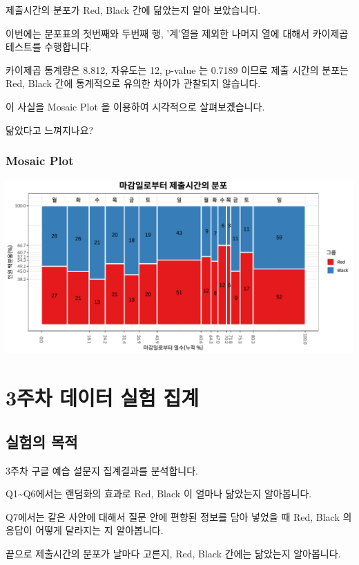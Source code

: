 \documentclass[
]{book}
\begin{document}
제출시간의 분포가 Red, Black 간에 닮았는지 알아 보았습니다.

이번에는 분포표의 첫번째와 두번째 행, '계'열을 제외한 나머지 열에 대해서 카이제곱테스트를 수행합니다.

카이제곱 통계량은 8.812, 자유도는 12, p-value 는 0.7189 이므로 제출 시간의 분포는 Red, Black 간에 통계적으로 유의한 차이가 관찰되지 않습니다.

이 사실을 Mosaic Plot 을 이용하여 시각적으로 살펴보겠습니다.

닮았다고 느껴지나요?

\subsection{Mosaic Plot}\label{mosaic-plot-3}

\includegraphics{Quiz_report_2025_files/figure-latex/unnamed-chunk-42-1.pdf}

\chapter{3주차 데이터 실험 집계}\label{uxc8fcuxcc28-uxb370uxc774uxd130-uxc2e4uxd5d8-uxc9d1uxacc4-2}

\section{실험의 목적}\label{uxc2e4uxd5d8uxc758-uxbaa9uxc801-2}

3주차 구글 예습 설문지 집계결과를 분석합니다.

Q1\textasciitilde Q6에서는 랜덤화의 효과로 Red, Black 이 얼마나 닮았는지 알아봅니다.

Q7에서는 같은 사안에 대해서 질문 안에 편향된 정보를 담아 넣었을 때 Red, Black 의 응답이 어떻게 달라지는 지 알아봅니다.

끝으로 제출시간의 분포가 날마다 고른지, Red, Black 간에는 닮았는지 알아봅니다.
\end{document}
